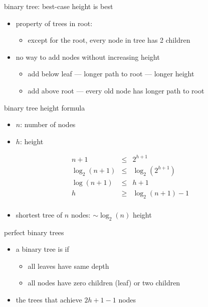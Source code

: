 \begin{frame}{binary tree: best-case height is best}
\begin{itemize}
\item property of trees in root:
    \begin{itemize}
        \item except for the root, every node in tree has 2 children
    \end{itemize}
\item no way to add nodes without increasing height
    \begin{itemize}
    \item add below leaf --- longer path to root --- longer height
    \item add above root --- every old node has longer path to root
    \end{itemize}
\end{itemize}
\end{frame}

\begin{frame}{binary tree height formula}
    \begin{itemize}
    \item $n$: number of nodes
    \item $h$: height
    \end{itemize}
\begin{eqnarray*}
    n + 1 &\le& 2^{h+1} \\
    \log_2(n+1) &\le& \log_2\left(2^{h+1}\right) \\
    \log(n+1) &\le& h+1 \\
    h &\ge& \log_2\left(n+1\right)-1 \\
\end{eqnarray*}
    \begin{itemize}
    \item shortest tree of $n$ nodes: $\sim \log_2(n)$ height
    \end{itemize}
\end{frame}

\begin{frame}{perfect binary trees}
    \begin{itemize}
    \item a binary tree is  if
        \begin{itemize}
        \item all leaves have same depth
        \item all nodes have zero children (leaf) or two children
        \end{itemize}
    \item {} the trees that achieve $2{h+1}-1$ nodes
    \end{itemize}
\end{frame}

